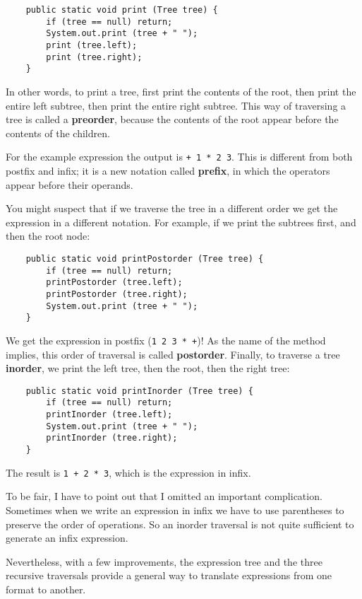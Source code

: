 \begin{verbatim}
    public static void print (Tree tree) {
        if (tree == null) return;
        System.out.print (tree + " ");
        print (tree.left);
        print (tree.right);
    }
\end{verbatim}
%
In other words, to print a tree, first print the contents of
the root, then print the entire left subtree, then print the
entire right subtree.  This way of traversing a tree is called
a {\bf preorder}, because the contents of the root appear before
the contents of the children.

For the example expression the output is {\tt + 1 * 2 3}.  This
is different from both postfix and infix; it is a new notation called
{\bf prefix}, in which the operators appear before their operands.

You might suspect that if we traverse the tree in a
different order we get the expression in a different
notation.  For example, if we print the subtrees first, and then
the root node:

\begin{verbatim}
    public static void printPostorder (Tree tree) {
        if (tree == null) return;
        printPostorder (tree.left);
        printPostorder (tree.right);
        System.out.print (tree + " ");
    }
\end{verbatim}
%
We get the expression in postfix ({\tt 1 2 3 * +})!  As the
name of the method implies, this order of traversal
is called {\bf postorder}.  Finally, to traverse a tree {\bf inorder},
we print the left tree, then the root, then the right tree:

\begin{verbatim}
    public static void printInorder (Tree tree) {
        if (tree == null) return;
        printInorder (tree.left);
        System.out.print (tree + " ");
        printInorder (tree.right);
    }
\end{verbatim}
%
The result is {\tt 1 + 2 * 3}, which is the expression in infix.

To be fair, I have to point out that I omitted an
important complication.  Sometimes when we write an expression
in infix we have to use parentheses to preserve the order of
operations.  So an inorder traversal is not quite sufficient to
generate an infix expression.

Nevertheless, with a few improvements, the expression tree 
and the three recursive traversals provide 
a general way to translate expressions from one format to
another.


